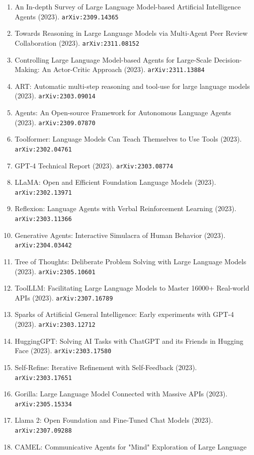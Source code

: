 \documentclass[11pt]{article}
\begin{document}
\begin{enumerate}
  \item An In-depth Survey of Large Language Model-based Artificial Intelligence
  Agents (2023). \texttt{arXiv:2309.14365}
  \item Towards Reasoning in Large Language Models via Multi-Agent Peer Review
  Collaboration (2023). \texttt{arXiv:2311.08152}
  \item Controlling Large Language Model-based Agents for Large-Scale
  Decision-Making: An Actor-Critic Approach (2023). \texttt{arXiv:2311.13884}
  \item ART: Automatic multi-step reasoning and tool-use for large language
  models (2023). \texttt{arXiv:2303.09014}
  \item Agents: An Open-source Framework for Autonomous Language Agents (2023). \texttt{arXiv:2309.07870}
  \item Toolformer: Language Models Can Teach Themselves to Use Tools (2023). \texttt{arXiv:2302.04761}
  \item GPT-4 Technical Report (2023). \texttt{arXiv:2303.08774}
  \item LLaMA: Open and Efficient Foundation Language Models (2023). \texttt{arXiv:2302.13971}
  \item Reflexion: Language Agents with Verbal Reinforcement Learning (2023). \texttt{arXiv:2303.11366}
  \item Generative Agents: Interactive Simulacra of Human Behavior (2023). \texttt{arXiv:2304.03442}
  \item Tree of Thoughts: Deliberate Problem Solving with Large Language Models (2023). \texttt{arXiv:2305.10601}
  \item ToolLLM: Facilitating Large Language Models to Master 16000+ Real-world
  APIs (2023). \texttt{arXiv:2307.16789}
  \item Sparks of Artificial General Intelligence: Early experiments with GPT-4 (2023). \texttt{arXiv:2303.12712}
  \item HuggingGPT: Solving AI Tasks with ChatGPT and its Friends in Hugging
  Face (2023). \texttt{arXiv:2303.17580}
  \item Self-Refine: Iterative Refinement with Self-Feedback (2023). \texttt{arXiv:2303.17651}
  \item Gorilla: Large Language Model Connected with Massive APIs (2023). \texttt{arXiv:2305.15334}
  \item Llama 2: Open Foundation and Fine-Tuned Chat Models (2023). \texttt{arXiv:2307.09288}
  \item CAMEL: Communicative Agents for "Mind" Exploration of Large Language

\end{enumerate}
\end{document}
